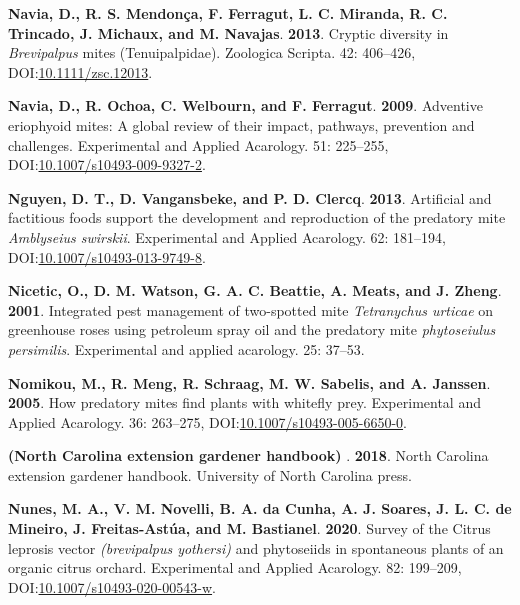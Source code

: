 \documentclass[12pt,final,CPage]{ufthesis}
\newlength{\cslhangindent}
\newenvironment{CSLReferences}[2] %
{%
	\setlength{\parindent}{0pt}
	\ifodd #1 \everypar{\setlength{\hangindent}{\cslhangindent}}\ignorespaces\fi
	\ifnum #2 > 0
	\setlength{\parskip}{#2\baselineskip}
	\fi
}%
{}
\begin{document}
{\begin{CSLReferences}{1}{0}
  \leavevmode{}%
  \textbf{Navia, D., R. S. Mendonça, F. Ferragut, L. C. Miranda, R. C. Trincado, J. Michaux, and M. Navajas}. \textbf{2013}. Cryptic diversity in {\emph{Brevipalpus}} mites ({Tenuipalpidae}). Zoologica Scripta. 42: 406--426, DOI:\href{https://doi.org/10.1111/zsc.12013}{10.1111/zsc.12013}.

  \leavevmode{}%
  \textbf{Navia, D., R. Ochoa, C. Welbourn, and F. Ferragut}. \textbf{2009}. Adventive eriophyoid mites: A global review of their impact, pathways, prevention and challenges. Experimental and Applied Acarology. 51: 225--255, DOI:\href{https://doi.org/10.1007/s10493-009-9327-2}{10.1007/s10493-009-9327-2}.

  \leavevmode{}%
  \textbf{Nguyen, D. T., D. Vangansbeke, and P. D. Clercq}. \textbf{2013}. Artificial and factitious foods support the development and reproduction of the predatory mite {\emph{Amblyseius swirskii}}. Experimental and Applied Acarology. 62: 181--194, DOI:\href{https://doi.org/10.1007/s10493-013-9749-8}{10.1007/s10493-013-9749-8}.

  \leavevmode{}%
  \textbf{Nicetic, O., D. M. Watson, G. A. C. Beattie, A. Meats, and J. Zheng}. \textbf{2001}. Integrated pest management of two-spotted mite {\emph{Tetranychus urticae}} on greenhouse roses using petroleum spray oil and the predatory mite \emph{phytoseiulus persimilis}. Experimental and applied acarology. 25: 37--53.

  \leavevmode{}%
  \textbf{Nomikou, M., R. Meng, R. Schraag, M. W. Sabelis, and A. Janssen}. \textbf{2005}. How predatory mites find plants with whitefly prey. Experimental and Applied Acarology. 36: 263--275, DOI:\href{https://doi.org/10.1007/s10493-005-6650-0}{10.1007/s10493-005-6650-0}.

  \leavevmode{}%
  \textbf{({North Carolina} extension gardener handbook) }. \textbf{2018}. {North Carolina} extension gardener handbook. University of {North Carolina} press.

  \leavevmode{}%
  \textbf{Nunes, M. A., V. M. Novelli, B. A. da Cunha, A. J. Soares, J. L. C. de Mineiro, J. Freitas-Astúa, and M. Bastianel}. \textbf{2020}. Survey of the {Citrus leprosis} vector \emph{(brevipalpus yothersi)} and phytoseiids in spontaneous plants of an organic citrus orchard. Experimental and Applied Acarology. 82: 199--209, DOI:\href{https://doi.org/10.1007/s10493-020-00543-w}{10.1007/s10493-020-00543-w}.


\end{CSLReferences}}
\end{document}
